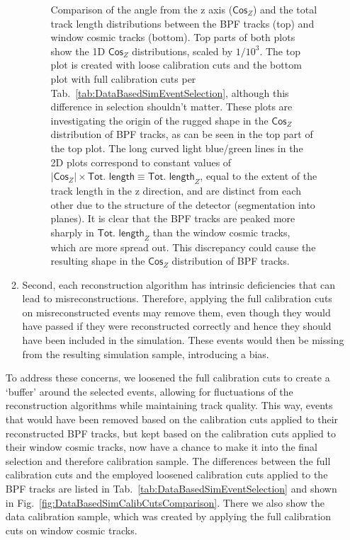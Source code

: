 \begin{enumerate}
\begin{enumerate}
\begin{figure}[!hbtp]
\caption[Comparison of the $\textsf{Cos}_Z$ and track length distributions between tracking algorithms for the data-based simulation selection]{Comparison of the angle from the z axis ($\textsf{Cos}_Z$) and the total track length distributions between the \acrshort{BPF} tracks (top) and window cosmic tracks (bottom). Top parts of both plots show the 1D $\textsf{Cos}_Z$ distributions, scaled by $1/10^3$. The top plot is created with loose calibration cuts and the bottom plot with full calibration cuts per Tab.~\ref{tab:DataBasedSimEventSelection}, although this difference in selection shouldn't matter. These plots are investigating the origin of the rugged shape in the $\textsf{Cos}_Z$ distribution of \acrshort{BPF} tracks, as can be seen in the top part of the top plot. The long curved light blue/green lines in the 2D plots correspond to constant values of $\left|\textsf{Cos}_Z\right|\times\textsf{Tot. length} \equiv \textsf{Tot. length}_Z$, equal to the extent of the track length in the z direction, and are distinct from each other due to the structure of the detector (segmentation into planes). It is clear that the \gls{BPF} tracks are peaked more sharply in $\textsf{Tot. length}_Z$ than the window cosmic tracks, which are more spread out. This discrepancy could cause the resulting shape in the $\textsf{Cos}_Z$ distribution of \acrshort{BPF} tracks.}
\label{fig:DataBasedSimBPFPeaks}
\end{figure}

\item Second, each reconstruction algorithm has intrinsic deficiencies that can lead to misreconstructions. Therefore, applying the full calibration cuts on misreconstructed events may remove them, even though they would have passed if they were reconstructed correctly and hence they should have been included in the simulation. These events would then be missing from the resulting simulation sample, introducing a bias.
\end{enumerate}

To address these concerns, we loosened the full calibration cuts to create a `buffer' around the selected events, allowing for fluctuations of the reconstruction algorithms while maintaining track quality. This way, events that would have been removed based on the calibration cuts applied to their reconstructed \gls{BPF} tracks, but kept based on the calibration cuts applied to their window cosmic tracks, now have a chance to make it into the final selection and therefore calibration sample. The differences between the full calibration cuts and the employed loosened calibration cuts applied to the \gls{BPF} tracks are listed in Tab.~\ref{tab:DataBasedSimEventSelection} and shown in Fig.~\ref{fig:DataBasedSimCalibCutsComparison}. There we also show the data calibration sample, which was created by applying the full calibration cuts on window cosmic tracks.
\end{enumerate}

